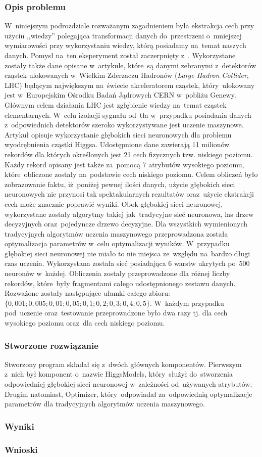 \subsubsection{Opis problemu}
W~niniejszym podrozdziale rozważanym zagadnieniem była ekstrakcja cech przy użyciu ,,wiedzy'' polegająca transformacji danych do~przestrzeni o~mniejszej wymiarowości przy wykorzystaniu wiedzy, którą posiadamy na~temat naszych danych. Pomysł na~ten eksperyment został zaczerpnięty z~\cite{higgs1}. Wykorzystane zostały także dane opisane w~artykule, które~są danymi zebranymi z~detektorów cząstek ulokowanych w~Wielkim Zderzaczu Hadronów (\textit{Large Hadron Collider}, LHC) będącym największym na~świecie akceleratorem cząstek, który~ulokowany jest w~Europejskim Ośrodku Badań Jądrowych CERN w~pobliżu Genewy. Głównym celem działania LHC jest zgłębienie wiedzy na~temat cząstek elementarnych. W~celu izolacji sygnału od~tła w~przypadku posiadania danych z~odpowiednich detektorów szeroko wykorzystywane jest uczenie maszynowe. Artykuł opisuje wykorzystanie głębokich sieci neuronowych dla problemu wyodrębnienia cząstki Higgsa. Udostępnione dane zawierają 11 milionów rekordów dla których określonych jest 21 cech fizycznych tzw. niskiego poziomu. Każdy rekord opisany jest także za~pomocą 7 atrybutów wysokiego poziomu, które~obliczone zostały na~podstawie cech niskiego poziomu. Celem obliczeń było zobrazowanie faktu, iż~poniżej pewnej ilości danych, użycie głębokich sieci neuronowych nie przynosi tak spektakularnych rezultatów oraz~użycie ekstrakcji cech może znacznie poprawić wyniki. Obok głębokiej sieci neuronowej, wykorzystane zostały algorytmy takiej jak~tradycyjne sieć neuronowa, las drzew decyzyjnych oraz~pojedyncze drzewo decyzyjne. Dla wszystkich wymienionych tradycyjnych algorytmów uczenia maszynowego przeprowadzona została optymalizacja parametrów w~celu optymalizacji wyników. W~przypadku głębokiej sieci neuronowej nie miało to nie miejsca ze~względu na~bardzo długi czas uczenia. Wykorzystana została sieć posiadająca 6 warstw ukrytych po~500 neuronów w~każdej. Obliczenia zostały przeprowadzone dla różnej liczby rekordów, które~były fragmentami całego udostępnionego zestawu danych. Rozważone zostały następujące ułamki całego zbioru: $\{0,001; 0,005; 0,01; 0,05; 0,1; 0,2; 0,3; 0,4; 0,5\}$. W~każdym przypadku pod~uczenie oraz~testowanie przeprowadzone było dwa razy tj. dla cech wysokiego poziomu oraz~dla cech niskiego poziomu.

\subsubsection{Stworzone rozwiązanie}
Stworzony program składał się z~dwóch głównych komponentów. Pierwszym z~nich był komponent o~nazwie HiggsModels, który~służył do~stworzenia odpowiedniej głębokiej sieci neuronowej w~zależności od~używanych atrybutów. Drugim natomiast, Optimizer, który~odpowiadał za~odpowiednią optymalizacje parametrów dla tradycyjnych algorytmów uczenia maszynowego.

\subsubsection{Wyniki}
\subsubsection{Wnioski}


